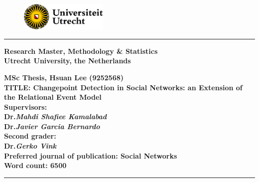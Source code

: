 \documentclass[]{interact}
\theoremstyle{plain}%
\theoremstyle{definition}
\theoremstyle{remark}
\begin{document}
    \begin{titlepage}
	
	    \raggedright %
	
	    \vspace*{-0.9cm}
	
	    \begin{figure}[H]
		    \includegraphics[width=4.2cm]{UU_logo}
	    \end{figure}
	
	    \vspace*{1.4cm}
	
	    \rule{\linewidth}{0.1pt} %
	
	    \vspace{0.3cm}
	    \large
	    \textbf{Research Master, Methodology \& Statistics} \\
	    \vspace{0.2cm}
	    \textbf{Utrecht University, the Netherlands}
	
	    \vspace{3cm}
    	\textbf{MSc Thesis, Hsuan Lee (9252568)} \\
	    \vspace{0.2cm}
	    \textbf{TITLE: Changepoint Detection in Social Networks: an Extension of the Relational Event Model} \\
	
	    \vspace{3cm}
	    \textbf{Supervisors:} \\
	    \vspace{0.2cm}
	    \textbf{Dr.\emph{Mahdi Shafiee Kamalabad}} \\
	    \vspace{0.2cm}
	    \textbf{Dr.\emph{Javier Garcia Bernardo}} \\
	
	    \vspace{1.75cm}
	    \textbf{Second grader:} \\
	    \vspace{0.2cm}
	    \textbf{Dr.\emph{Gerko Vink}} \\
	
	    \vspace{1.75cm}
	    \textbf{Preferred journal of publication: Social Networks} \\
	    \vspace{0.2cm}
	    \textbf{Word count: 6500}
	
	    \rule{\linewidth}{0.1pt} %
	
    \end{titlepage}
\end{document}
